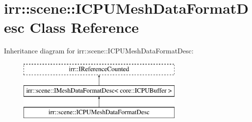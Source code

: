 \hypertarget{classirr_1_1scene_1_1ICPUMeshDataFormatDesc}{}\section{irr\+:\+:scene\+:\+:I\+C\+P\+U\+Mesh\+Data\+Format\+Desc Class Reference}
\label{classirr_1_1scene_1_1ICPUMeshDataFormatDesc}
Inheritance diagram for irr\+:\+:scene\+:\+:I\+C\+P\+U\+Mesh\+Data\+Format\+Desc\+:\begin{figure}[H]
\begin{center}
\leavevmode
\includegraphics[height=3.000000cm]{classirr_1_1scene_1_1ICPUMeshDataFormatDesc}
\end{center}
\end{figure}
